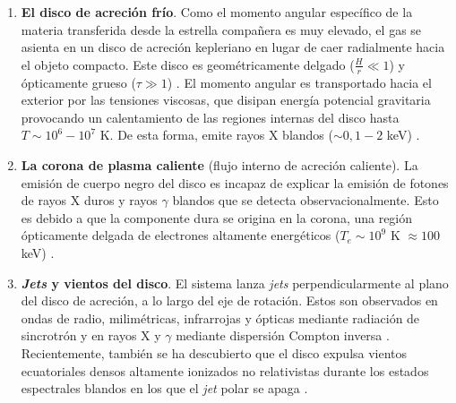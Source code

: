 \begin{enumerate}
    \newpage
    De esta forma, $f(M_1)$ constituye una cota inferior absoluta para $M_1$:
    \begin{enumerate}
        \item Si $M_1\leq M_{TOV}\simeq 2-3 M_\odot$ (estabilidad de Tolman-Oppenheimer-Volkoff \cite{mornas2026bloque2}) el objeto suele ser una estrella de neutrones, donde las fuentes de tipo Z emiten intensamente en radio de forma asociada a los \textit{jets}, las fuentes \textit{Atoll} lo hacen también más débilmente. Los púlsares de rayos X fuertemente magnetizados ($B\sim 10^{12}$ G) no producen \textit{jets} de radio debido al truncamiento a gran distancia que produce la magnetosfera sobre el disco de acreción \cite{chaty}.
        \item Si $M_1>3 M_\odot$ el objeto es un agujero negro de Kerr, caracterizado de forma única por su masa $M$ y su parámetro adimensional de \textit{spin} $a_\ast=\frac{Jc}{GM^2}\in[-1,1]$ al ser eléctricamente neutro \cite{mirabel,fender_gallo}. Esto se debe a que la presión de degeneración cuántica y las fuerzas nucleares fuertes son incapaces de detener el colapso.
    \end{enumerate} 
    \item \textbf{El disco de acreción frío}. Como el momento angular específico de la materia transferida desde la estrella compañera es muy elevado, el gas se asienta en un disco de acreción kepleriano en lugar de caer radialmente hacia el objeto compacto. Este disco es geométricamente delgado ($\frac{H}{r} \ll 1$) y ópticamente grueso ($\tau \gg 1$) \cite{malzac}. El momento angular es transportado hacia el exterior por las tensiones viscosas, que disipan energía potencial gravitaria provocando un calentamiento de las regiones internas del disco hasta $T\sim 10^6-10^7$ K. De esta forma, emite rayos X blandos ($\sim0,1-2$ keV) \cite{fender_gallo,malzac}.
    \item \textbf{La corona de plasma caliente} (flujo interno de acreción caliente). La emisión de cuerpo negro del disco es incapaz de explicar la emisión de fotones de rayos X duros y rayos $\gamma$ blandos que se detecta observacionalmente. Esto es debido a que la componente dura se origina en la corona, una región ópticamente delgada de electrones altamente energéticos ($T_e\sim10^9$ K $\approx100$ keV) \cite{malzac}.
    \item \textbf{\textit{Jets} y vientos del disco}. El sistema lanza \textit{jets} perpendicularmente al plano del disco de acreción, a lo largo del eje de rotación. Estos son observados en ondas de radio, milimétricas, infrarrojas y ópticas mediante radiación de sincrotrón y en rayos X y $\gamma$ mediante dispersión Compton inversa \cite{paredes,fender_gallo,malzac}. Recientemente, también se ha descubierto que el disco expulsa vientos ecuatoriales densos altamente ionizados no relativistas durante los estados espectrales blandos en los que el \textit{jet} polar se apaga \cite{fender_gallo}.
\end{enumerate}
